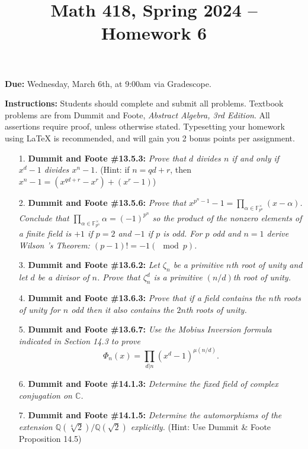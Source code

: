 \documentclass[12pt]{article}
\title{Math 418, Spring 2024 -- Homework 6}
\date{}
\newcommand{\Q}{\mathbb{Q}}
\newcommand{\C}{\mathbb{C}}
\newcommand{\F}{\mathbb{F}}
\begin{document}
 \maketitle
\vspace{-80pt}

\textbf{Due:} Wednesday, March 6th, at 9:00am via Gradescope.

\textbf{Instructions:} Students should complete and submit all problems. Textbook problems are from Dummit and Foote, \emph{Abstract Algebra, 3rd Edition}. All assertions require proof, unless otherwise stated. Typesetting your homework using LaTeX is recommended, and will gain you 2 bonus points per assignment.

\begin{enumerate}

\item[1.] \textbf{Dummit and Foote \#13.5.3:} \textit{Prove that $d$ divides $n$ if and only if $x^d - 1$ divides $x^n - 1$.} (Hint: if $n = qd+r$, then $x^n-1 = (x^{qd+r}-x^r) + (x^r-1)$)

\item[2.] \textbf{Dummit and Foote \#13.5.6:} \textit{Prove that $x^{p^n-1}-1 = \prod_{\alpha\in\F_{p^n}^\times} (x-\alpha)$. Conclude that $\prod_{\alpha\in\F_{p^n}^\times}\alpha = (-1)^{p^n}$ so the product of the nonzero elements of a finite field is $+1$ if $p = 2$ and $-1$ if $p$ is odd. For $p$ odd and $n = 1$ derive Wilson 's Theorem: $(p - 1)! = -1 (\mod p)$.}

\item[3.] \textbf{Dummit and Foote \#13.6.2:} \textit{Let $\zeta_n$ be a primitive $n$th root of unity and let $d$ be a divisor of $n$. Prove that $\zeta_n^d$ is a primitive $(n/d)$th root of unity.}

\item[4.] \textbf{Dummit and Foote \#13.6.3:}  \textit{Prove that if a field contains the $n$th roots of unity for $n$ odd then it also contains the $2n$th roots of unity.}

\item[5.] \textbf{Dummit and Foote \#13.6.7:}  \textit{Use the Mobius Inversion formula indicated in Section 14.3 to prove \[\Phi_n(x) = \prod_{d|n} (x^d-1)^{\mu(n/d)}.\]}

\item[6.] \textbf{Dummit and Foote \#14.1.3:}  \textit{Determine the fixed field of complex conjugation on $\C$.}

\item[7.] \textbf{Dummit and Foote \#14.1.5:}  \textit{Determine the automorphisms of the extension $\Q(\sqrt[4]{2})/\Q(\sqrt{2})$ explicitly.} (Hint: Use Dummit \& Foote Proposition 14.5)

\end{enumerate}
\end{document}
